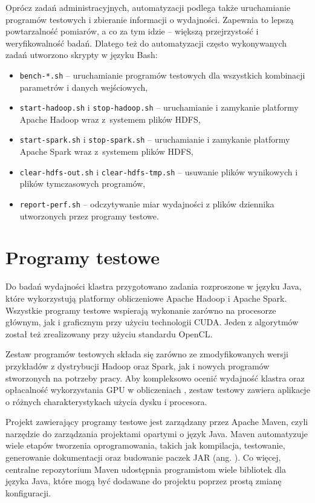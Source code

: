 Oprócz zadań administracyjnych, automatyzacji podlega także uruchamianie programów
testowych i zbieranie informacji o wydajności. Zapewnia to lepszą powtarzalność
pomiarów, a co za tym idzie -- większą przejrzystość i weryfikowalność badań.
Dlatego też do automatyzacji często wykonywanych zadań utworzono skrypty w języku Bash:
\begin{itemize}
	\item \lstinline{bench-*.sh} --
	      uruchamianie programów testowych dla wszystkich kombinacji
	      parametrów i danych wejściowych,
	\item \lstinline{start-hadoop.sh} i \lstinline{stop-hadoop.sh} --
	      uruchamianie i zamykanie platformy Apache Hadoop wraz z~systemem plików HDFS,
	\item \lstinline{start-spark.sh} i \lstinline{stop-spark.sh} --
	      uruchamianie i zamykanie platformy Apache Spark wraz z~systemem plików HDFS,
	\item \lstinline{clear-hdfs-out.sh} i \lstinline{clear-hdfs-tmp.sh} --
	      usuwanie plików wynikowych i plików tymczasowych programów,
	\item \lstinline{report-perf.sh} -- odczytywanie miar wydajności z
	      plików dziennika utworzonych przez programy testowe.
\end{itemize}

\section{Programy testowe}

Do badań wydajności klastra przygotowano zadania rozproszone w języku Java, które wykorzystują
platformy obliczeniowe Apache Hadoop i Apache Spark. Wszystkie programy testowe wspierają wykonanie
zarówno na procesorze głównym, jak i graficznym przy użyciu technologii CUDA. Jeden z algorytmów
został też zrealizowany przy użyciu standardu OpenCL.

Zestaw programów testowych składa się zarówno ze zmodyfikowanych wersji przykładów z dystrybucji
Hadoop oraz Spark, jak i nowych programów stworzonych na potrzeby pracy. Aby kompleksowo
ocenić wydajność klastra oraz opłacalność wykorzystania GPU w obliczeniach ,
zestaw testowy zawiera aplikacje o różnych charakterystykach użycia dysku i procesora.

Projekt zawierający programy testowe jest zarządzany przez Apache Maven, czyli narzędzie do
zarządzania projektami opartymi o język Java. Maven automatyzuje wiele etapów tworzenia
oprogramowania, takich jak kompilacja, testowanie, generowanie dokumentacji oraz budowanie
paczek JAR (ang. ). Co więcej, centralne repozytorium Maven udostępnia
programistom wiele bibliotek dla języka Java, które mogą być dodawane do projektu poprzez
prostą zmianę konfiguracji.

